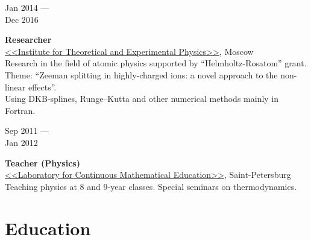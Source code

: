 \documentclass[10pt,a4paper]{article}
\newcommand{\lmpratio}{0.15}
\newcommand{\rmpratio}{0.74}
\newcommand{\verticalSpace}{0.3cm}
\newcommand{\vSpace}{0.5cm}
\newcommand{\horizontalSpace}{0.05\textwidth}
\newcommand{\sectionMain}[1]{\textbf{#1}}
\begin{document}
	\begin{minipage}[t]{\lmpratio\textwidth}
		Jan 2014 --- \\Dec 2016
	\end{minipage}
	\hspace{\horizontalSpace}
	\begin{minipage}[t]{\rmpratio\textwidth}
		\sectionMain{Researcher}\\
		\href{http://frrc.itep.ru/index.php/en/}{<<Institute for Theoretical and Experimental Physics>>}, Moscow\\[0.5cm]
		Research in the field of atomic physics supported by ``Helmholtz-Rosatom'' grant. 
		Theme: ``Zeeman splitting in highly-charged ions: a novel approach to the non-linear effects''. \\[0.5cm]

        Using DKB-splines, Runge–Kutta and other numerical methods mainly in Fortran.
  
	\end{minipage}
	
	\vspace{\vSpace}

	
	
	\begin{minipage}[t]{\lmpratio\textwidth}
		Sep 2011 --- \\Jan 2012
	\end{minipage}
	\hspace{\horizontalSpace}
	\begin{minipage}[t]{\rmpratio\textwidth}
		\sectionMain{Teacher (Physics)}\\
		\href{http://lnmo.ru/}{<<Laboratory for Continuous Mathematical Education>>}, Saint-Petersburg\\[0.5cm]
		Teaching physics at 8 and 9-year classes. Special seminars on thermodynamics.
	\end{minipage}	
	\vspace{\verticalSpace}
	\vspace{\verticalSpace}
	\section*{Education}
	
\end{document}
